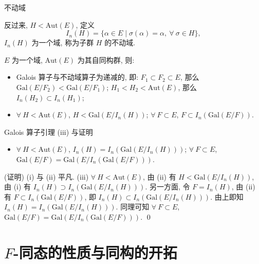 \begin{frame}{不动域}

反过来, $H < \mathrm{Aut}(E)$, 定义
\[
I_n(H) = \{ \alpha \in E \mid \sigma(\alpha) = \alpha,\ \forall\ \sigma \in H \},
\]
$I_n(H)$ 为一个域, 称为子群 $H$ 的不动域.

\pause

\begin{lem}[Galois 算子]
$E$ 为一个域, $\mathrm{Aut}(E)$ 为其自同构群, 则:
\begin{itemize}
\item[(i)] Galois 算子与不动域算子为递减的, 即:
  $F_1 \subset F_2 \subset E$, 那么 $\mathrm{Gal}(E/F_2) < \mathrm{Gal}(E/F_1)$;
  $H_1 < H_2 < \mathrm{Aut}(E)$, 那么 $I_n(H_2) \subset I_n(H_1)$;
\item[(ii)] $\forall\ H < \mathrm{Aut}(E)$,
  $H < \mathrm{Gal}(E/I_n(H))$;\quad
  $\forall\ F \subset E$, $F \subset I_n(\mathrm{Gal}(E/F))$.
\end{itemize}
\end{lem}

\end{frame}


\begin{frame}{Galois 算子引理 (iii) 与证明}

\begin{lem}[Galois 算子, 续]
\begin{itemize}
\item[(iii)] $\forall\ H < \mathrm{Aut}(E)$,
  $I_n(H) = I_n(\mathrm{Gal}(E/I_n(H)))$;\quad
  $\forall\ F \subset E$,
  $\mathrm{Gal}(E/F) = \mathrm{Gal}(E/I_n(\mathrm{Gal}(E/F)))$.
\end{itemize}
\end{lem}

\startproof[bg=yellow, fg=red](证明)
(i) 与 (ii) 平凡.
(iii) $\forall\ H < \mathrm{Aut}(E)$, 由 (ii) 有
$H < \mathrm{Gal}(E/I_n(H))$, 由 (i) 有
$I_n(H) \supset I_n(\mathrm{Gal}(E/I_n(H)))$.
另一方面, 令 $F = I_n(H)$, 由 (ii) 有 $F \subset I_n(\mathrm{Gal}(E/F))$,
即 $I_n(H) \subset I_n(\mathrm{Gal}(E/I_n(H)))$.
由上即知 $I_n(H) = I_n(\mathrm{Gal}(E/I_n(H)))$.
同理可知 $\forall\ F \subset E$,
$\mathrm{Gal}(E/F) = \mathrm{Gal}(E/I_n(\mathrm{Gal}(E/F)))$.
\qed

\end{frame}


\section[开拓]{$F$-同态的性质与同构的开拓}

